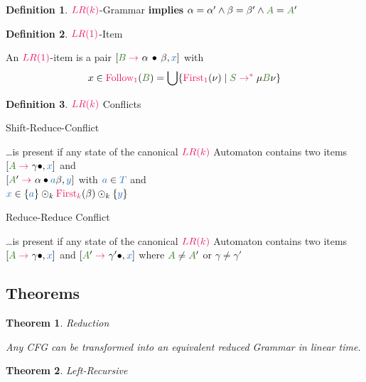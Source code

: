 \documentclass[10pt, landscape]{article}
\newtheorem{theorem}{Theorem}
\theoremstyle{definition}
\newtheorem{definition}{Definition}[section]
\newcommand{\Op}[1]{\textcolor{WildStrawberry}{#1}}
\newcommand{\KConcat}{\odot_{k}}
\newcommand{\Bul}{\,\bullet\,}
\newcommand{\derive}[1][]{\Op{\;\rightarrow_{#1}\;}}
\newcommand{\derives}[1][]{\Op{\;\rightarrow_{#1}^{*}\;}}
\newcommand{\nontermcolor}{OliveGreen}
\newcommand{\nt}[1]{\textcolor{\nontermcolor}{#1}}
\newcommand{\ntA}{\nt{A}}
\newcommand{\ntB}{\nt{B}}
\newcommand{\ntS}{\nt{S}}
\newcommand{\termcolor}{NavyBlue}
\newcommand{\term}[1]{\textcolor{\termcolor}{#1}}
\newcommand{\terms}{\textcolor{\termcolor}{T}}
\newcommand{\termA}{\textcolor{\termcolor}{a}}
\newcommand{\termX}{\textcolor{\termcolor}{x}}
\newcommand{\prodcolor}{WildStrawberry}
\newcommand{\LROne}{\textcolor{\prodcolor}{LR (1)}}
\newcommand{\LRk}{\textcolor{\prodcolor}{LR (k)}}
\newcommand{\FollowOne}{\textcolor{\prodcolor}{\text{Follow}_{1}}}
\newcommand{\FirstOne}{\textcolor{\prodcolor}{\text{First}_{1}}}
\newcommand{\FirstK}{\textcolor{\prodcolor}{\text{First}_{k}}}
\begin{document}
\begin{multicols*}{3}
\begin{definition}{$\LRk$-Grammar}
  \textbf{implies} $\alpha = \alpha' \land \beta = \beta' \land \ntA = \ntA'$

\end{definition}

\begin{definition}{$\LROne$-Item}

  An $\LROne$-item is a pair $[\ntB \derive \alpha \Bul \beta, \termX]$ with
  \[
    x \in \FollowOne (\ntB) = \bigcup \{ \FirstOne (\nu) \mid \ntS \derives \mu \ntB \nu\}
  \]

\end{definition}

\begin{definition}{$\LRk$ Conflicts}

  \begin{compactenum}
    \item Shift-Reduce-Conflict

          \dots is present if any state of the canonical $\LRk$ Automaton contains two items
          $[\ntA \derive \gamma \bullet, \termX]$ and \\ $[\ntA' \derive \alpha \bullet \termA \beta, \term{y}]$
          with $\termA \in \terms$ and \\ $\termX \in \{ \termA \} \KConcat \FirstK (\beta) \KConcat \{ \term{y} \}$

    \item Reduce-Reduce Conflict

          \dots is present if any state of the canonical $\LRk$ Automaton contains two items
          $[\ntA \derive \gamma \bullet, \termX]$ and $[\ntA' \derive \gamma' \bullet, \termX]$
          where $\ntA \neq \ntA'$ or $\gamma \neq \gamma'$

  \end{compactenum}

\end{definition}

\subsection*{Theorems}

\begin{theorem}{Reduction}

  Any CFG can be transformed into an equivalent reduced Grammar in linear time.

\end{theorem}

\begin{theorem}{Left-Recursive}


\end{theorem}
\end{multicols*}
\end{document}
